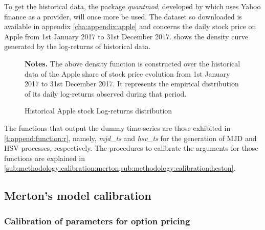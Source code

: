 \documentclass[a4paper, 12pt]{report}
\begin{document}
To get the historical data, the package \textit{quantmod}, developed by \citet{quantmod} which uses Yahoo finance as a provider,  will once more be used. The dataset so downloaded is available in appendix \ref{cha:appendix:apple} and concerns the daily stock price on Apple from 1st January 2017 to 31st December 2017.
 shows the density curve generated by the log-returns of historical data.

\begin{figure}[h]
  \centering
  
  \caption{Historical Apple stock Log-returns distribution}
  \begin{changemargin}{0.5cm}{0.5cm}
  \medskip
\footnotesize
{}\textbf{Notes.} The above density function is constructed over the historical data of the Apple share of stock price evolution from 1st January 2017 to 31st December 2017. 
It represents the empirical distribution of its daily log-returns observed during that period.
  \end{changemargin}
  \label{p:methodology:density:aapl}
\end{figure}

The functions that output the dummy time-series are those exhibited in \cref{t:append:function:r}, namely, \textit{mjd\_ts} and \textit{hsv\_ts} for the generation of  MJD and HSV processes, respectively.
The procedures to calibrate the arguments for those functions are explained in \cref{sub:methodology:calibration:merton,sub:methodology:calibration:heston}.










\subsection{Merton's model calibration}
\label{sub:methodology:calibration:merton}

\subsubsection*{Calibration of parameters for option pricing}
\end{document}
